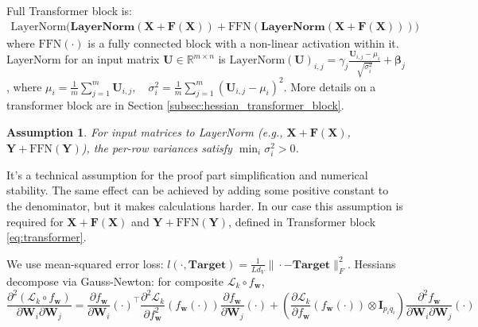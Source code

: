 \documentclass{article}
\newtheorem{assumption}{Assumption}
\begin{document}
Full Transformer block is:
\begin{align}
\text{LayerNorm}\Big(\mathbf{\text{LayerNorm}(\mathbf{X} + \mathbf{F}(\mathbf{X}))} + \mathrm{FFN}(\mathbf{\text{LayerNorm}(\mathbf{X} + \mathbf{F}(\mathbf{X}))})\Big)
\end{align}
where \(\mathrm{FFN}(\cdot)\) is a fully connected block with a non-linear activation within it. LayerNorm for an input matrix $\mathbf{U} \in \mathbb{R}^{m \times n}$ is \(\text{LayerNorm}(\mathbf{U})_{i,j} = \gamma_j \frac{\mathbf{U}_{i,j} - \mu_i}{\sqrt{\sigma_i^2}} + \mathbf{\beta}_j\), where $\mu_i = \frac{1}{m} \sum_{j=1}^m \mathbf{U}_{i,j}, \quad \sigma_i^2 = \frac{1}{m} \sum_{j=1}^m (\mathbf{U}_{i,j} - \mu_i)^2$. More details on a transformer block are in Section \ref{subsec:hessian_transformer_block}.
\begin{assumption} \label{as:non_zero_variance}
For input matrices to LayerNorm (e.g., \(\mathbf{X} + \mathbf{F}(\mathbf{X})\), \(\mathbf{Y} + \mathrm{FFN}(\mathbf{Y})\)), the per-row variances satisfy \(\min_i \sigma_i^2 > 0\).
\end{assumption}
It's a technical assumption for the proof part simplification and numerical stability. The same effect can be achieved by adding some positive constant to the denominator, but it makes calculations harder. In our case this assumption is required for $\mathbf{X} + \mathbf{F}(\mathbf{X})$ and $\mathbf{Y} + \text{FFN}(\mathbf{Y})$, defined in Transformer block \ref{eq:transformer}.

We use mean-squared error loss: \(l(\cdot, \textbf{Target}) = \frac{1}{L d_V} \|\cdot - \textbf{Target}\|_F^2\). Hessians decompose via Gauss-Newton: for composite \(\mathcal{L}_k \circ f_{\mathbf{w}}\),
\begin{equation} \label{eq:gauss_decomposition}
\frac{\partial^2 (\mathcal{L}_k \circ f_{\mathbf{w}})}{\partial \mathbf{W}_i \partial \mathbf{W}_j} = \frac{\partial f_{\mathbf{w}}}{\partial \mathbf{W}_i} (\cdot)^\top \frac{\partial^2 \mathcal{L}_k}{\partial f_{\mathbf{w}}^2} (f_{\mathbf{w}}(\cdot)) \frac{\partial f_{\mathbf{w}}}{\partial \mathbf{W}_j}(\cdot) + \left( \frac{\partial \mathcal{L}_k}{\partial f_{\mathbf{w}}} (f_{\mathbf{w}}(\cdot)) \otimes \mathbf{I}_{p_i q_i} \right) \frac{\partial^2 f_{\mathbf{w}}}{\partial \mathbf{W}_i \partial \mathbf{W}_j}(\cdot)
\end{equation}

\end{document}
